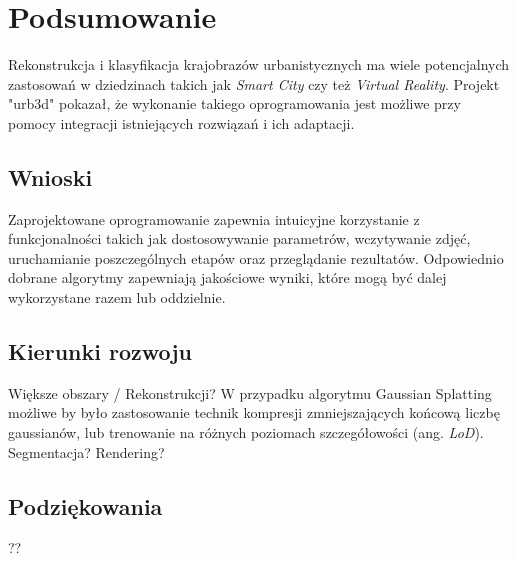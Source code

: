 \section{Podsumowanie}
Rekonstrukcja i klasyfikacja krajobrazów urbanistycznych ma wiele potencjalnych zastosowań w dziedzinach takich jak \textit{Smart City} czy też \textit{Virtual Reality}. Projekt "urb3d" pokazał, że wykonanie takiego oprogramowania jest możliwe przy pomocy integracji istniejących rozwiązań i ich adaptacji. 

\subsection{Wnioski}
Zaprojektowane oprogramowanie zapewnia intuicyjne korzystanie z funkcjonalności takich jak dostosowywanie parametrów, wczytywanie zdjęć, uruchamianie poszczególnych etapów oraz przeglądanie rezultatów. Odpowiednio dobrane algorytmy zapewniają jakościowe wyniki, które mogą być dalej wykorzystane razem lub oddzielnie. 

\subsection{Kierunki rozwoju}
Większe obszary / Rekonstrukcji? 
W przypadku algorytmu Gaussian Splatting możliwe by było zastosowanie technik kompresji zmniejszających końcową liczbę gaussianów, lub trenowanie na różnych poziomach szczegółowości (ang. \textit{LoD}).
Segmentacja? 
Rendering? 

\subsection{Podziękowania}
??